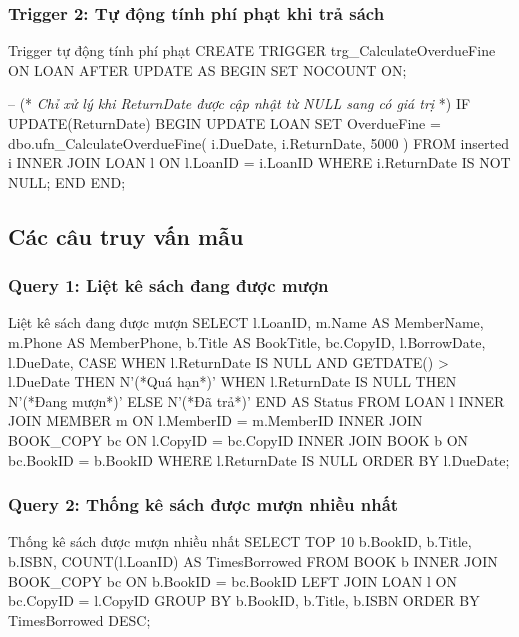 \documentclass[12pt,a4paper]{article}
\newcommand{\vncomment}[1]{\textit{\color{green!50!black}#1}}
\begin{document}
\subsubsection{Trigger 2: Tự động tính phí phạt khi trả sách}

\begin{sqlcode}{Trigger tự động tính phí phạt}
CREATE TRIGGER trg_CalculateOverdueFine
ON LOAN
AFTER UPDATE
AS
BEGIN
    SET NOCOUNT ON;

    -- (* \vncomment{Chỉ xử lý khi ReturnDate được cập nhật từ NULL sang có giá trị} *)
    IF UPDATE(ReturnDate)
    BEGIN
        UPDATE LOAN
        SET OverdueFine = dbo.ufn_CalculateOverdueFine(
                            i.DueDate,
                            i.ReturnDate,
                            5000
                         )
        FROM inserted i
        INNER JOIN LOAN l ON l.LoanID = i.LoanID
        WHERE i.ReturnDate IS NOT NULL;
    END
END;
\end{sqlcode}

\subsection{Các câu truy vấn mẫu}

\subsubsection{Query 1: Liệt kê sách đang được mượn}

\begin{sqlcode}{Liệt kê sách đang được mượn}
SELECT
    l.LoanID,
    m.Name AS MemberName,
    m.Phone AS MemberPhone,
    b.Title AS BookTitle,
    bc.CopyID,
    l.BorrowDate,
    l.DueDate,
    CASE
        WHEN l.ReturnDate IS NULL AND GETDATE() > l.DueDate
            THEN N'(*Quá hạn*)'
        WHEN l.ReturnDate IS NULL
            THEN N'(*Đang mượn*)'
        ELSE N'(*Đã trả*)'
    END AS Status
FROM LOAN l
INNER JOIN MEMBER m ON l.MemberID = m.MemberID
INNER JOIN BOOK_COPY bc ON l.CopyID = bc.CopyID
INNER JOIN BOOK b ON bc.BookID = b.BookID
WHERE l.ReturnDate IS NULL
ORDER BY l.DueDate;
\end{sqlcode}

\subsubsection{Query 2: Thống kê sách được mượn nhiều nhất}

\begin{sqlcode}{Thống kê sách được mượn nhiều nhất}
SELECT TOP 10
    b.BookID,
    b.Title,
    b.ISBN,
    COUNT(l.LoanID) AS TimesBorrowed
FROM BOOK b
INNER JOIN BOOK_COPY bc ON b.BookID = bc.BookID
LEFT JOIN LOAN l ON bc.CopyID = l.CopyID
GROUP BY b.BookID, b.Title, b.ISBN
ORDER BY TimesBorrowed DESC;
\end{sqlcode}
\end{document}
